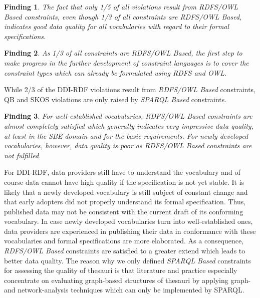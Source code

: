 \documentclass[conference]{IEEEtran}
\newcommand{\tb}[1]{\todo[size=\small, color=green!40]{\textbf{Thomas:} #1}}
\newtheorem{hyp}{Finding}
\begin{document}
\begin{hyp}
The fact that only 1/5 of all violations result from RDFS/OWL Based constraints, even though 1/3 of all constraints are RDFS/OWL Based, indicates good data quality for all vocabularies with regard to their formal specifications.
\end{hyp}

\begin{hyp}
As 1/3 of all constraints are RDFS/OWL Based, the first step to make progress in the further development of constraint languages is to cover the constraint types which can already be formulated using RDFS and OWL.
\end{hyp} 

While 2/3 of the DDI-RDF violations result from \emph{RDFS/OWL Based} constraints,
QB and SKOS violations are only raised by \emph{SPARQL Based} constraints.

\begin{hyp}
For well-established vocabularies, RDFS/OWL Based constraints are almost completely satisfied which generally indicates very impressive data quality, at least in the SBE domain and for the basic requirements. For newly developed vocabularies, however, data quality is poor as RDFS/OWL Based constraints are not fulfilled. 
\end{hyp}

For DDI-RDF, data providers still have to understand the vocabulary and of course data cannot have high quality if the specification is not yet stable.
It is likely that a newly developed vocabulary is still subject of constant change
and that early adopters did not properly understand its formal specification.
Thus, published data may not be consistent with the current draft of its conforming vocabulary.
In case newly developed vocabularies turn into well-established ones,
data providers are experienced in publishing their data in conformance with these vocabularies
and formal specifications are more elaborated. 
As a consequence, \emph{RDFS/OWL Based} constraints are satisfied to a greater extend which leads to better data quality.  
%
The reason why we only defined \emph{SPARQL Based} constraints for assessing the quality of thesauri is that literature and practice especially concentrate on evaluating graph-based structures of thesauri by applying graph- and network-analysis techniques which can only be implemented by SPARQL.
\end{document}
